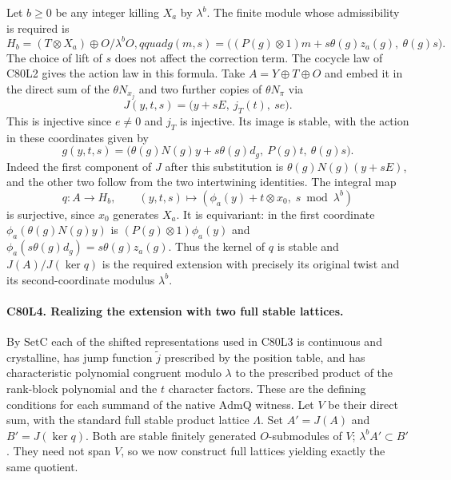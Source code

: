 Let $b\ge0$ be any integer killing $X_a$ by $\lambda^b$.
The finite module whose admissibility is required is
\[
 H_b=(T\otimes X_a)\oplus O/\lambda^bO,qquad
 g(m,s)=\big((P(g)\otimes 1)m+s\theta(g)z_a(g),\ \theta(g)s\big).
\]
The choice of lift of $s$ does not affect the correction term.
The cocycle law of C80L2 gives the action law in this formula.
Take $A=Y\oplus T\oplus O$ and embed it in the direct sum of the
$\theta N_{x_j}$ and two further copies of $\theta N_\pi$ via
\[
 J(y,t,s)=\big(y+sE,\ j_T(t),\ se\big).
\]
This is injective since $e\ne0$ and $j_T$ is injective. Its image
is stable, with the action in these coordinates given by
\[
 g(y,t,s)=
 \big(\theta(g)N(g)y+s\theta(g)d_g,\ P(g)t,\ \theta(g)s\big).
\]
Indeed the first component of $J$ after this substitution is
$\theta(g)N(g)(y+sE)$, and the other two follow from the two
intertwining identities. The integral map
\[
 q:A\longrightarrow H_b,\qquad
 (y,t,s)\longmapsto(\phi_a(y)+t\otimes x_0,\;s\bmod\lambda^b)
\]
is surjective, since $x_0$ generates $X_a$. It is equivariant:
in the first coordinate $\phi_a(\theta(g)N(g)y)$ is
$(P(g)\otimes 1)\phi_a(y)$ and
$\phi_a(s\theta(g)d_g)=s\theta(g)z_a(g)$.
Thus the kernel of $q$ is stable and $J(A)/J(\ker q)$ is the
required extension with precisely its original twist and its
second-coordinate modulus $\lambda^b$.

\paragraph{C80L4. Realizing the extension with two full stable lattices.}
By $\mathrm{SetC}$ each of the shifted representations used in
C80L3 is continuous and crystalline, has jump function
$\widetilde j$ prescribed by the position table, and has characteristic
polynomial congruent modulo $\lambda$ to the prescribed product
of the rank-block polynomial and the $t$ character factors.
These are the defining conditions for each summand of the native
$\mathrm{AdmQ}$ witness. Let $V$ be their direct sum, with the
standard full stable product lattice $\Lambda$. Set $A'=J(A)$ and
$B'=J(\ker q)$. Both are stable finitely generated $O$-submodules
of $V$; $\lambda^b A'\subset B'$. They need not span $V$, so
we now construct full lattices yielding exactly the same quotient.

